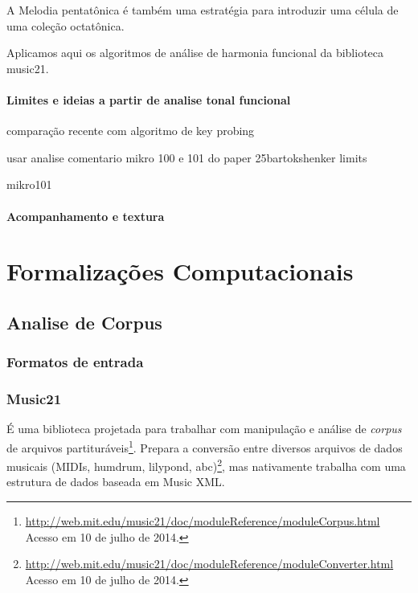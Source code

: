 \documentclass[
	12pt,				%
	openright,			%
	twoside,			%
	a4paper,			%
	english,			%
	french,				%
	spanish,			%
	brazil				%
	]{abntex2}
\begin{document}
A Melodia pentatônica é também uma estratégia para introduzir uma célula de uma coleção octatônica.

Aplicamos aqui os algoritmos de análise de harmonia funcional da biblioteca music21.

\subsection{Limites e ideias a partir de analise tonal funcional}

comparação recente com algoritmo de key probing
\cite{cooper1998unfolding}


usar analise comentario mikro 100 e 101 do paper 25bartokshenker limits
\cite[ p.179]{brown1997iv}

mikro101
\cite[ p.113]{straus2004}

\subsection{Acompanhamento e textura}

\cite{starr1985melody}



%
%
%

\part{Formalizações Computacionais}

\chapter{Analise de Corpus}

\section{Formatos de entrada}

\section{Music21}

É uma biblioteca projetada para trabalhar com manipulação e análise de \textit{corpus} de arquivos partituráveis\footnote{\url{http://web.mit.edu/music21/doc/moduleReference/moduleCorpus.html} Acesso em 10 de julho de 2014.}. Prepara a conversão entre diversos arquivos de dados musicais (MIDIs, humdrum, lilypond, abc)\footnote{\url{http://web.mit.edu/music21/doc/moduleReference/moduleConverter.html} Acesso em 10 de julho de 2014.}, mas nativamente trabalha com uma estrutura de dados baseada em Music XML.
\end{document}
